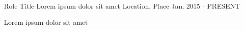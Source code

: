 

\begin{cventries}

  \cventry
    {Role Title} %
    {Lorem ipsum dolor sit amet} %
    {Location, Place} %
    {Jan. 2015 - PRESENT} %
    {
      \begin{cvitems} %
        \item {Lorem ipsum dolor sit amet}
      \end{cvitems}
    }

\end{cventries}
